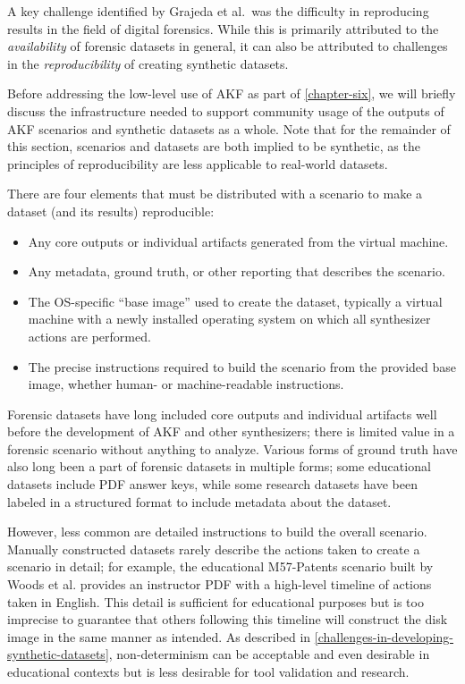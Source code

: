 \documentclass[letterpaper,12pt]{report}
\def\tightlist{}
\begin{document}
A key challenge identified by Grajeda et al.~was the difficulty in
reproducing results in the field of digital forensics. While this is
primarily attributed to the \emph{availability} of forensic datasets in
general, it can also be attributed to challenges in the
\emph{reproducibility} of creating synthetic datasets.

Before addressing the low-level use of AKF as part of \autoref{chapter-six}, we will briefly discuss the infrastructure needed
to support community usage of the outputs of AKF scenarios and synthetic
datasets as a whole. Note that for the remainder of this section,
scenarios and datasets are both implied to be synthetic, as the
principles of reproducibility are less applicable to real-world
datasets.

There are four elements that must be distributed with a scenario to make
a dataset (and its results) reproducible:

\begin{itemize}
\tightlist
\item
  Any core outputs or individual artifacts generated from the virtual
  machine.
\item
  Any metadata, ground truth, or other reporting that describes the
  scenario.
\item
  The OS-specific ``base image'' used to create the dataset, typically a
  virtual machine with a newly installed operating system on which all
  synthesizer actions are performed.
\item
  The precise instructions required to build the scenario from the
  provided base image, whether human- or machine-readable instructions.
\end{itemize}

Forensic datasets have long included core outputs and individual
artifacts well before the development of AKF and other synthesizers;
there is limited value in a forensic scenario without anything to
analyze. Various forms of ground truth have also long been a part of
forensic datasets in multiple forms; some educational datasets include
PDF answer keys, while some research datasets have been labeled in a
structured format to include metadata about the dataset.

However, less common are detailed instructions to build the overall
scenario. Manually constructed datasets rarely describe the actions
taken to create a scenario in detail; for example, the educational
M57-Patents scenario built by Woods et al.
\cite{woodsCreatingRealisticCorpora2011} provides an instructor PDF
with a high-level timeline of actions taken in English. This detail is
sufficient for educational purposes but is too imprecise to guarantee
that others following this timeline will construct the disk image in the
same manner as intended. As described in \autoref{challenges-in-developing-synthetic-datasets},
non-determinism can be acceptable and even desirable in educational
contexts but is less desirable for tool validation and research.
\end{document}
